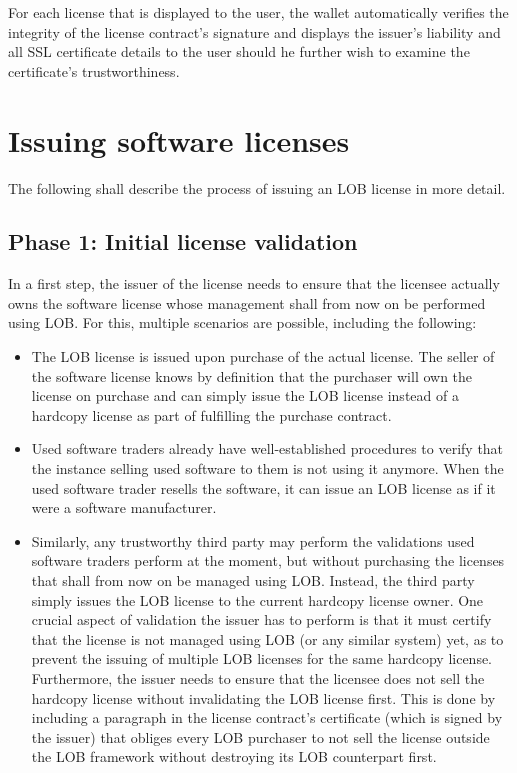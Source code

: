 \documentclass[a4paper]{article}
\begin{document}
For each license that is displayed to the user, the wallet automatically verifies the integrity of the license contract's signature and displays the issuer's liability and all SSL certificate details to the user should he further wish to examine the certificate's trustworthiness.





\section{Issuing software licenses}
\label{ch:issuingSoftwareLicenses}

The following shall describe the process of issuing an LOB license in more detail. 

\subsection{Phase 1: Initial license validation}

In a first step, the issuer of the license needs to ensure that the licensee actually owns the software license whose management shall from now on be performed using LOB. For this, multiple scenarios are possible, including the following:
\begin{itemize}
  \item The LOB license is issued upon purchase of the actual license. The seller of the software license knows by definition that the purchaser will own the license on purchase and can simply issue the LOB license instead of a hardcopy license as part of fulfilling the purchase contract.

  \item Used software traders already have well-established procedures to verify that the instance selling used software to them is not using it anymore. When the used software trader resells the software, it can issue an LOB license as if it were a software manufacturer.

  \item Similarly, any trustworthy third party may perform the validations used software traders perform at the moment, but without purchasing the licenses that shall from now on be managed using LOB. Instead, the third party simply issues the LOB license to the current hardcopy license owner. One crucial aspect of validation the issuer has to perform is that it must certify that the license is not managed using LOB (or any similar system) yet, as to prevent the issuing of multiple LOB licenses for the same hardcopy license. Furthermore, the issuer needs to ensure that the licensee does not sell the hardcopy license without invalidating the LOB license first. This is done by including a paragraph in the license contract's certificate (which is signed by the issuer) that obliges every LOB purchaser to not sell the license outside the LOB framework without destroying its LOB counterpart first.
\end{itemize}
\end{document}
